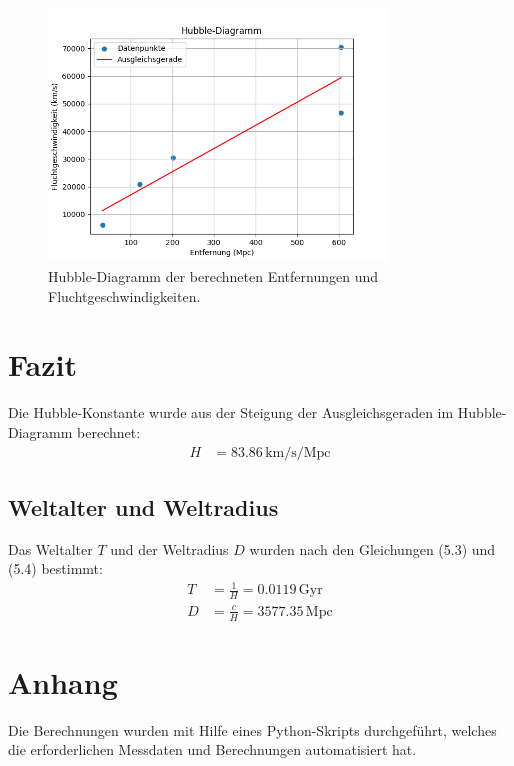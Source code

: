 \documentclass[a4paper,12pt]{article}
\begin{document}
\begin{figure}[H]
    \centering
    \includegraphics[width=0.8\textwidth]{HubbleDiagramm.png}
    \caption{Hubble-Diagramm der berechneten Entfernungen und Fluchtgeschwindigkeiten.}
    \label{fig:hubble_diagramm}
\end{figure}

\section*{Fazit}
Die Hubble-Konstante wurde aus der Steigung der Ausgleichsgeraden im Hubble-Diagramm berechnet:
\begin{align*}
H &= 83.86 \, \text{km/s/Mpc}
\end{align*}

\subsection*{Weltalter und Weltradius}
Das Weltalter $T$ und der Weltradius $D$ wurden nach den Gleichungen (5.3) und (5.4) bestimmt:
\begin{align*}
T &= \frac{1}{H} = 0.0119 \, \text{Gyr} \\
D &= \frac{c}{H} = 3577.35 \, \text{Mpc}
\end{align*}

\section*{Anhang}
Die Berechnungen wurden mit Hilfe eines Python-Skripts durchgeführt, welches die erforderlichen Messdaten und Berechnungen automatisiert hat.
\end{document}
